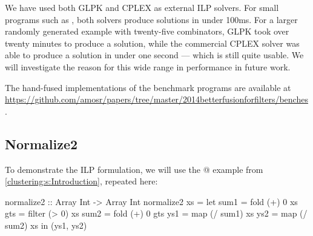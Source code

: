 We have used both GLPK and CPLEX as external ILP solvers.
For small programs such as \Hs@normalizeInc@, both solvers produce solutions in under 100ms.
For a larger randomly generated example with twenty-five combinators, GLPK took over twenty minutes to produce a solution, while the commercial CPLEX solver was able to produce a solution in under one second --- which is still quite usable.
We will investigate the reason for this wide range in performance in future work.


The hand-fused implementations of the benchmark programs are available at \url{https://github.com/amosr/papers/tree/master/2014betterfusionforfilters/benches}.



\pagebreak
\subsection{Normalize2}
To demonstrate the ILP formulation, we will use the @ example from \cref{clustering:s:Introduction}, repeated here:
\begin{haskell}
normalize2 :: Array Int -> Array Int
normalize2 xs
 = let sum1 = fold   (+)  0   xs
       gts  = filter (>   0)  xs
       sum2 = fold   (+)  0   gts
       ys1  = map    (/ sum1) xs
       ys2  = map    (/ sum2) xs
   in (ys1, ys2)
\end{haskell}

